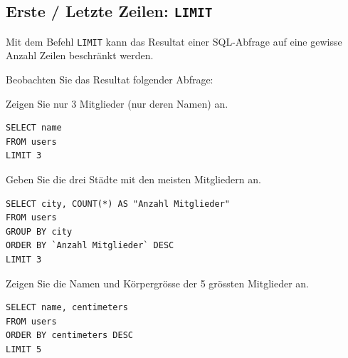\subsection{Erste / Letzte Zeilen: \texorpdfstring{\lstinline[style=sql]|LIMIT|}{LIMIT}}
Mit dem Befehl \lstinline[style=sql]|LIMIT| kann das Resultat einer \gls{SQL}-Abfrage auf eine gewisse Anzahl Zeilen beschränkt werden.

Beobachten Sie das Resultat folgender Abfrage:



\begin{myexercise}
  Zeigen Sie nur 3 Mitglieder (nur deren Namen) an.
  \begin{myanswer}
    \begin{lstlisting}[style=sql]
SELECT name
FROM users
LIMIT 3
\end{lstlisting}
  \end{myanswer}
\end{myexercise}

\begin{myexercise}
  Geben Sie die drei Städte mit den meisten Mitgliedern an.
  \begin{myanswer}
    \begin{lstlisting}[style=sql]
SELECT city, COUNT(*) AS "Anzahl Mitglieder"
FROM users
GROUP BY city
ORDER BY `Anzahl Mitglieder` DESC
LIMIT 3
\end{lstlisting}
  \end{myanswer}
\end{myexercise}

\begin{myexercise}
  Zeigen Sie die Namen und Körpergrösse der 5 grössten Mitglieder an.
  \begin{myanswer}
    \begin{lstlisting}[style=sql]
SELECT name, centimeters
FROM users
ORDER BY centimeters DESC
LIMIT 5
\end{lstlisting}
  \end{myanswer}
\end{myexercise}

